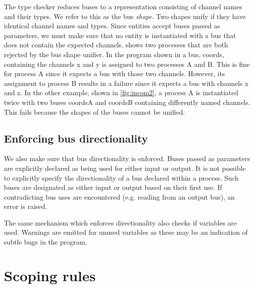 The type checker reduces buses to a representation consisting of channel names
and their types. We refer to this as the bus {\itshape shape}. Two shapes unify
if they have identical channel names and types. Since entities accept buses
passed as parameters, we must make sure that no entity is instantiated with a
bus that does not contain the expected channels.  shows two
processes that are both rejected by the bus shape unifier. In the program shown
in  a bus, {\ttfamily coords}, containing the channels
{\ttfamily x} and {\ttfamily y} is assigned to two processes {\ttfamily A} and
{\ttfamily B}. This is fine for process {\ttfamily A} since it expects a bus
with those two channels. However, its assignment to process {\ttfamily B}
results in a failure since it expects a bus with channels {\ttfamily x} and
{\ttfamily z}. In the other example, shown in \cref{fig:incom2}, a process
{\ttfamily A} is instantiated twice with two buses {\ttfamily coordsA} and
{\ttfamily coordsB} containing differently named channels. This fails because
the shapes of the buses cannot be unified.


\subsection{Enforcing bus directionality}
We also make sure that bus directionality is enforced. Buses passed as
parameters are explicitly declared as being used for either input or output. It
is not possible to explicitly specify the directionality of a bus declared
within a process. Such buses are designated as either input or output based on
their first use. If contradicting bus uses are encountered (e.g. reading from an
output bus), an error is raised.

The same mechanism which enforces directionality also checks if variables are
used. Warnings are emitted for unused variables as these may be an indication of
subtle bugs in the program.

\section{Scoping rules}

